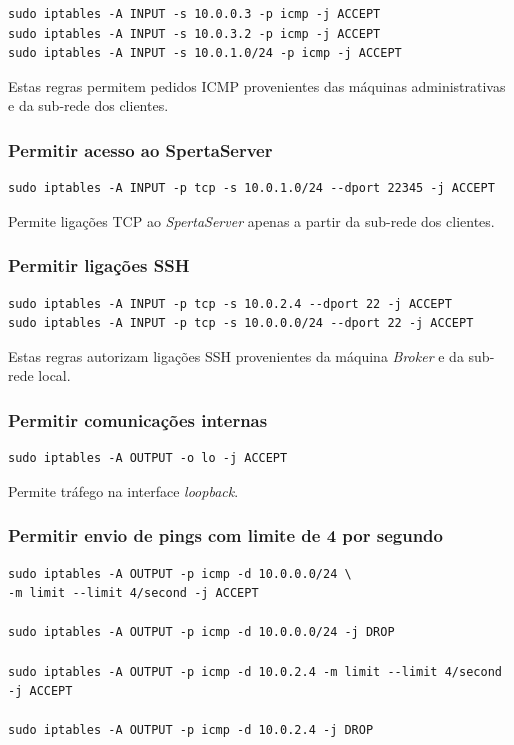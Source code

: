 \documentclass{article}
\begin{document}
\begin{lstlisting}
sudo iptables -A INPUT -s 10.0.0.3 -p icmp -j ACCEPT
sudo iptables -A INPUT -s 10.0.3.2 -p icmp -j ACCEPT
sudo iptables -A INPUT -s 10.0.1.0/24 -p icmp -j ACCEPT
\end{lstlisting}

Estas regras permitem pedidos ICMP provenientes das máquinas administrativas e da sub-rede dos clientes.

\subsubsection{Permitir acesso ao SpertaServer}

\begin{lstlisting}
sudo iptables -A INPUT -p tcp -s 10.0.1.0/24 --dport 22345 -j ACCEPT
\end{lstlisting}

Permite ligações TCP ao \textit{SpertaServer} apenas a partir da sub-rede dos clientes.

\subsubsection{Permitir ligações SSH}

\begin{lstlisting}
sudo iptables -A INPUT -p tcp -s 10.0.2.4 --dport 22 -j ACCEPT
sudo iptables -A INPUT -p tcp -s 10.0.0.0/24 --dport 22 -j ACCEPT
\end{lstlisting}

Estas regras autorizam ligações SSH provenientes da máquina \textit{Broker} e da sub-rede local.

\subsubsection{Permitir comunicações internas}

\begin{lstlisting}
sudo iptables -A OUTPUT -o lo -j ACCEPT
\end{lstlisting}

Permite tráfego na interface \textit{loopback}.

\subsubsection{Permitir envio de pings com limite de 4 por segundo}

\begin{lstlisting}
sudo iptables -A OUTPUT -p icmp -d 10.0.0.0/24 \
-m limit --limit 4/second -j ACCEPT

sudo iptables -A OUTPUT -p icmp -d 10.0.0.0/24 -j DROP

sudo iptables -A OUTPUT -p icmp -d 10.0.2.4 -m limit --limit 4/second -j ACCEPT

sudo iptables -A OUTPUT -p icmp -d 10.0.2.4 -j DROP
\end{lstlisting}
\end{document}
